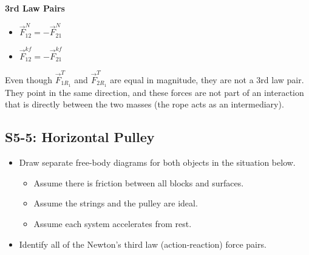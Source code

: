 \documentclass[]{article}
\begin{document}
\begin{TeacherMargin}
\begin{center}
\end{center}
\textbf{3rd Law Pairs}
\begin{itemize}
	\item $\vec{F}^{N}_{12}=-\vec{F}^{N}_{21}$
	\item $\vec{F}^{kf}_{12}=-\vec{F}^{kf}_{21}$
\end{itemize}
Even though $\vec{F}^{T}_{1R_{1}}$ and $\vec{F}^{T}_{2R_{1}}$ are equal in magnitude, they are not a 3rd law pair. They point in the same direction, and these forces are not part of an interaction that is directly between the two masses (the rope acts as an intermediary).
\end{TeacherMargin}
\begin{PresentSpace}
\vspace{-10pt}
\section*{S5-5: Horizontal Pulley}
\vspace{-10pt}
\begin{itemize}
	\item Draw separate free-body diagrams for both objects in the situation below.
	\begin{itemize}
		\item Assume there is friction between all blocks and surfaces.
		\item Assume the strings and the pulley are ideal.
		\item Assume each system accelerates from rest.
	\end{itemize}
	\item Identify all of the Newton's third law (action-reaction) force pairs.
\end{itemize}
\begin{center}
\end{center}
\end{PresentSpace}
\end{document}
